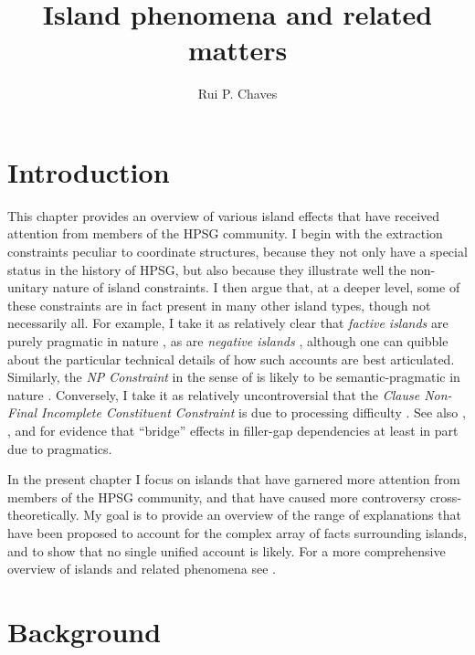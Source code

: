 \documentclass[output=paper,biblatex,babelshorthands,newtxmath,draftmode,colorlinks,citecolor=brown]{langscibook}
\author{Rui P. Chaves\affiliation{University at Buffalo, SUNY}}
\title{Island phenomena and related matters}
\begin{document}
\maketitle
\label{chap-islands}



\section{Introduction} 

This chapter provides an overview of various island effects that have received attention from
members of the HPSG community. I begin with the extraction constraints peculiar to coordinate
structures, because they not only have a special status in the history of HPSG, but also because
they illustrate well the non-unitary nature of island constraints. I then argue that, at a deeper
level, some of these constraints are in fact present in many other island types, though not
necessarily all.  For example, I take it as relatively clear that \emph{factive islands} are purely
pragmatic in nature \citep{Oshima:2006:FIP:1761528.1761544}, as are \emph{negative islands}
\citep{Kroch98a,sza,abrusan,foxneg,abrusanspec}, although one can quibble about the particular
technical details of how such accounts are best articulated.  Similarly, the \emph{NP Constraint} in
the sense of \citet{horn72} is likely to be semantic-pragmatic in nature
\citep{kuno87,godard92f,dubinsky2009,SS2013b-u,chavesking2020}.  Conversely, I take it as relatively
uncontroversial that the \emph{Clause Non-Final Incomplete Constituent Constraint} is due to
processing difficulty \citep{lev91,fodor92}. See also \citet{kothari}, \citet{ambridge:2008}, and
\citet{richterchaves20} for evidence that ``bridge'' effects in filler-gap dependencies at least in
part due to pragmatics.

In the present chapter I focus on islands that have garnered more attention from members of the HPSG
community, and that have caused more controversy cross-theoretically. My goal is to provide an
overview of the range of explanations that have been proposed to account for the complex array of
facts surrounding islands, and to show that no single unified account is likely.
For a more comprehensive overview of islands and related phenomena see \citet[Chapter~3]{CP2020a-u}.



\section{Background}
\end{document}
